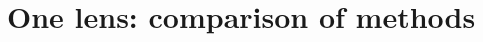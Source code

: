 \documentclass{iucr}              %
\begin{document}
\section{One lens: comparison of methods}
\label{appendix:comparison}



    
\end{document}
